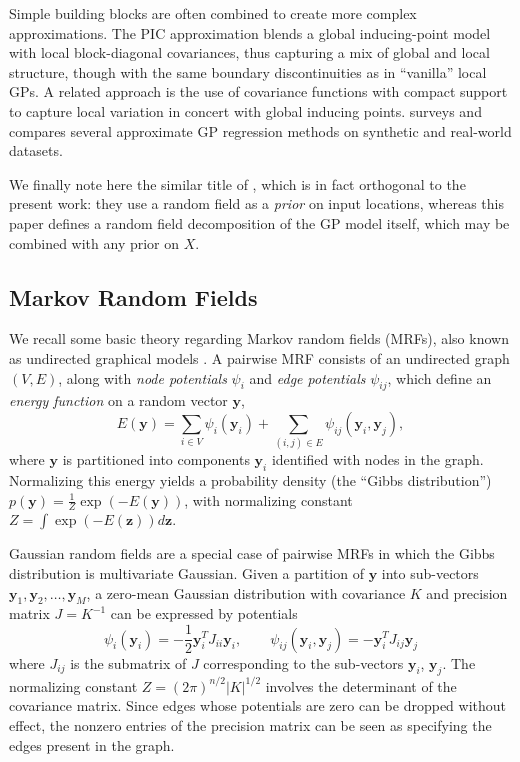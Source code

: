 \documentclass{article}
\renewcommand{\v}[1]{\mathbf{#1}}
\begin{document}
Simple building blocks are often combined to create more complex
approximations. 
The PIC approximation \cite{snelson2007} blends a global
inducing-point model with local block-diagonal covariances, 
thus capturing a mix of global and local
structure, though with the same boundary discontinuities as in
``vanilla'' local GPs. A related approach is the use of covariance
functions with compact support \cite{vanhatalo2008} to capture local
variation in concert with global inducing points. \cite{chalupka2012} surveys and compares
several approximate GP regression methods on synthetic and real-world
datasets. 

We finally note here the similar title of \cite{zhong2010gaussian},
which is in fact orthogonal to the present work: they use a random
field as a {\em prior} on input locations, whereas this paper defines a
random field decomposition of the GP model itself, which may be
combined with any prior on $X$.

\subsection{Markov Random Fields}

We recall some basic theory regarding Markov random fields
(MRFs), also known as undirected graphical models \cite{koller2009probabilistic}. A pairwise
MRF consists of an undirected graph $(V, E)$, along with {\em node potentials} $\psi_i$ and {\em edge
potentials} $\psi_{ij}$, which define an {\em energy function} on a random vector $\v{y}$,
\begin{equation}
E(\v{y}) = \sum_{i\in V} \psi_{i}(\v{y}_i) + \sum_{(i,j)\in E}
\psi_{ij}(\v{y}_i, \v{y}_j),\label{eqn:mrf}
\end{equation}
where $\v{y}$ is partitioned into components
$\v{y}_i$ identified with nodes in the graph. Normalizing
this energy yields a probability density (the ``Gibbs
distribution'') $p(\v{y}) = \frac{1}{Z}\exp(-E(\v{y}))$, with
normalizing constant $Z = \int \exp(-E(\v{z})) d\v{z}$.

Gaussian random fields are a special case of pairwise MRFs in which
the Gibbs distribution is multivariate Gaussian. Given a partition of
$\v{y}$ into sub-vectors $\v{y}_1, \v{y}_2, \ldots, \v{y}_M$, a
zero-mean Gaussian distribution with covariance $K$ and precision
matrix $J = K^{-1}$ can
be expressed by potentials 
\begin{equation}
\psi_i(\v{y}_i) = -\frac{1}{2}\v{y}_i^T
J_{ii} \v{y}_i, \qquad\psi_{ij}(\v{y}_i, \v{y}_j) = -\v{y}_i^T J_{ij}
\v{y}_j \label{eqn:gaussian-mrf}
\end{equation} where $J_{ij}$ is the submatrix of $J$ corresponding
to the sub-vectors $\v{y}_i$, $\v{y}_j$. The
normalizing constant $Z =
(2\pi)^{n/2}|K|^{1/2}$ involves the determinant of the covariance
matrix. Since edges whose potentials are zero can be dropped without
effect, the nonzero entries of the precision matrix can be seen as
specifying the edges present in the graph. 
\end{document}

